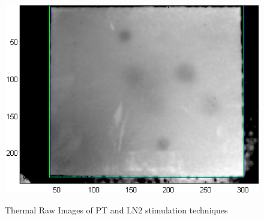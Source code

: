 \documentclass[]{spie}  %
\begin{document}
\begin{figure}[ht]
{      \includegraphics[scale=0.5]{graph/Cool_Raw.png}
      \label{LN2_raw}
   }
   \caption{Thermal Raw Images of PT and LN2 stimulation techniques}      
   \label{raw_results}
\end{figure}
\end{document}
